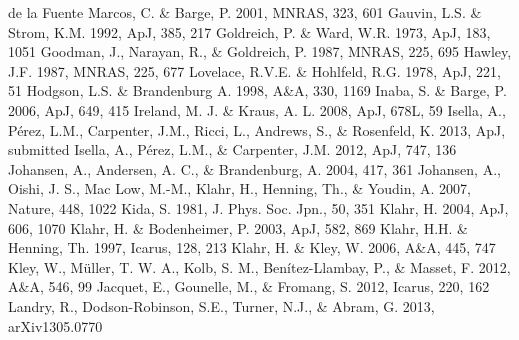\documentclass[apj]{emulateapj}
\begin{document}
\begin{thebibliography}{}
 de la Fuente Marcos, C. \& Barge, P. 2001, MNRAS, 323, 601 
 Gauvin, L.S. \& Strom, K.M. 1992, ApJ, 385, 217
 Goldreich, P. \& Ward, W.R. 1973, ApJ, 183, 1051
 Goodman, J., Narayan, R., \& Goldreich, P. 1987, MNRAS, 225, 695
 Hawley, J.F. 1987, MNRAS, 225, 677
  Lovelace, R.V.E. \& Hohlfeld, R.G. 1978, ApJ, 221, 51
 Hodgson, L.S. \& Brandenburg A. 1998, A\&A, 330, 1169
 Inaba, S. \& Barge, P. 2006, ApJ, 649, 415
 Ireland, M. J. \& Kraus, A. L. 2008, ApJ, 678L, 59
 Isella, A., P\'erez, L.M., Carpenter, J.M., Ricci, L., Andrews, S., \& Rosenfeld, K. 2013, ApJ, submitted
 Isella, A., P\'erez, L.M., \& Carpenter, J.M. 2012, ApJ, 747, 136
 Johansen, A., Andersen, A. C., \& Brandenburg, A. 2004, 417, 361
 Johansen, A., Oishi, J. S., Mac Low, M.-M., Klahr, H., Henning, Th., \& Youdin, A. 2007, Nature, 448, 1022
 Kida, S. 1981, J. Phys. Soc. Jpn.,  50, 351
 Klahr, H. 2004, ApJ, 606, 1070
 Klahr, H. \& Bodenheimer, P. 2003, ApJ, 582, 869
 Klahr, H.H. \& Henning, Th. 1997, Icarus, 128, 213
 Klahr, H. \& Kley, W. 2006, A\&A, 445, 747
 Kley, W., M\"uller, T. W. A., Kolb, S. M., Ben\'itez-Llambay, P., \& Masset, F. 2012, A\&A, 546, 99
 Jacquet, E., Gounelle, M., \& Fromang, S. 2012, Icarus, 220, 162
 Landry, R., Dodson-Robinson, S.E., Turner, N.J., \& Abram, G. 2013, arXiv1305.0770

\end{thebibliography}
\end{document}

